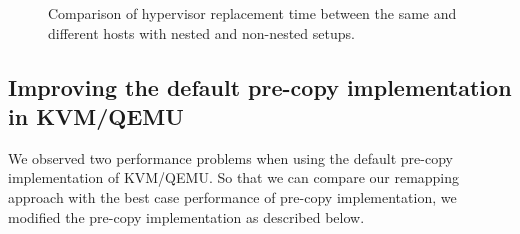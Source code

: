 
\begin{figure}[h!]
	\centering
	\caption{Comparison of hypervisor replacement time between the same and different hosts with nested and non-nested setups.}
	\label{fig:motiv}
\end{figure}

\subsection{Improving the default pre-copy implementation in KVM/QEMU} 
We observed two performance problems when using the default pre-copy implementation of KVM/QEMU.
So that we can compare our remapping approach with the best case performance of pre-copy implementation, 
we modified the pre-copy implementation as described below. 

